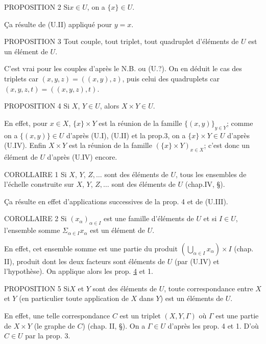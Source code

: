 \begin{enonce*}{PROPOSITION 2}
Si\pageoriginale $x\in U$, on a $\{x\}\in U$.
\end{enonce*}
\c Ca résulte de (U.II) appliqué pour $y=x$.

\begin{enonce*}{PROPOSITION 3}
Tout couple, tout triplet, tout quadruplet d'éléments de $U$ est un
élément de $U$.
\end{enonce*}
C'est vrai pour les couples d'après le N.B. ou (U.?). On en déduit
le cas des triplets car $(x,y,z)=((x,y),z)$, puis celui des
quadruplets car $(x,y,z,t)=((x,y,z),t)$.

\begin{enonce*}{PROPOSITION 4}
Si $X$, $Y\in U$, alors $X\times Y\in U$.
\end{enonce*}
En effet, pour $x\in X$, $\{x\}\times Y$ est la réunion de la
famille $\{(x,y)\}_{y\in Y}$; comme on a $\{(x,y)\}\in U$ d'après
(U.I), (U.II) et la prop.3, on a $\{x\}\times Y\in U$ d'après
(U.IV). Enfin $X\times Y$ est la réunion de la famille $(\{x\}\times
Y)_{x\in X}$; c'est donc un élément de $U$ d'après (U.IV) encore.

\begin{enonce*}{COROLLAIRE 1}
Si $X$, $Y$, $Z,\ldots$ sont des éléments de $U$, tous les ensembles
de l'échelle construite sur $X$, $Y$, $Z,\ldots$ sont des éléments
de $U$ {\rm(\cf chap.IV, \S)}.
\end{enonce*}

\c Ca résulte en effet d'applications successives de la prop. 4 et
de (U.III).

\begin{enonce*}{COROLLAIRE 2}
Si $(x_{\alpha})_{\alpha \in I}$ est une famille d'éléments de $U$
et si $I\in U$, l'ensemble somme $\Sigma_{\alpha \in I} x_{\alpha}$
est un élément de $U$.
\end{enonce*}
En effet, cet ensemble somme est une partie du produit
$(\bigcup_{\alpha\in I} x_{\alpha})\times I$ (chap. II), produit
dont les deux facteurs sont éléments de $U$ (par (U.IV) et
l'hypothèse). On applique alors les prop. \hyperref[I.sec4]{4} et 1.

\begin{enonce*}{PROPOSITION 5}
Si\pageoriginale $X$ et $Y$ sont des éléments de $U$, toute
correspondance entre $X$ et $Y$ (en particulier toute application de
$X$ dans $Y$) est un éléments de $U$.
\end{enonce*}
En effet, une telle correspondance $C$ est un triplet $(X,Y,\Gamma)$
où $\Gamma$ est une partie de $X\times Y$ (le graphe de $C$) (chap.
II, \S). On a $\Gamma\in U$ d'après les prop. 4 et 1. D'où $C\in U$
par la prop. 3.

